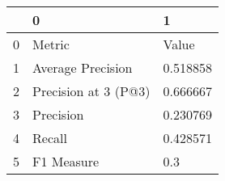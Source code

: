 \begin{tabular}{lll}
\toprule
{} &                     0 &         1 \\
\midrule
0 &                Metric &     Value \\
1 &     Average Precision &  0.518858 \\
2 &  Precision at 3 (P@3) &  0.666667 \\
3 &             Precision &  0.230769 \\
4 &                Recall &  0.428571 \\
5 &            F1 Measure &       0.3 \\
\bottomrule
\end{tabular}
